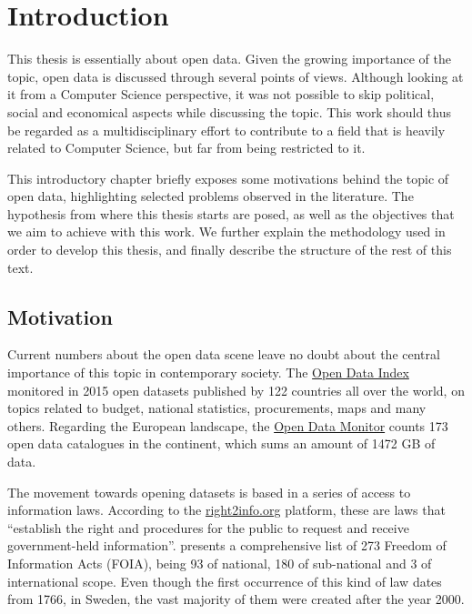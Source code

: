 \chapter{Introduction}

This thesis is essentially about open data.
Given the growing importance of the topic, open data is discussed through several points of views.
Although looking at it from a Computer Science perspective, it was not possible to skip political, social and economical aspects while discussing the topic.
This work should thus be regarded as a multidisciplinary effort to contribute to a field that is heavily related to Computer Science, but far from being restricted to it.

This introductory chapter briefly exposes some motivations behind the topic of open data, highlighting selected problems observed in the literature.
The hypothesis from where this thesis starts are posed, as well as the objectives that we aim to achieve with this work.
We further explain the methodology used in order to develop this thesis, and finally describe the structure of the rest of this text.

\section{Motivation}
Current numbers about the open data scene leave no doubt about the central importance of this topic in contemporary society.
The \href{http://index.okfn.org/place/}{Open Data Index} monitored in 2015 open datasets published by 122 countries all over the world, on topics related to budget, national statistics, procurements, maps and many others.
Regarding the European landscape, the \href{http://opendatamonitor.eu/}{Open Data Monitor} counts 173 open data catalogues in the continent, which sums an amount of 1472 GB of data.

The movement towards opening datasets is based in a series of access to information laws. 
According to the \href{http://right2info.org}{right2info.org} platform, these are laws that ``establish the right and procedures for the public to request and receive government-held information''.
 presents a comprehensive list of 273 Freedom of Information Acts (FOIA), being 93 of national, 180 of sub-national and 3 of international scope.
Even though the first occurrence of this kind of law dates from 1766, in Sweden, the vast majority of them were created after the year 2000.

